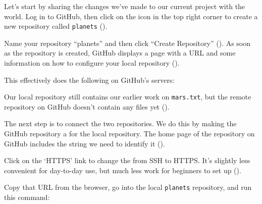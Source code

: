 Let's start by sharing the changes we've made to our current project
with the world. Log in to GitHub, then click on the icon in the top
right corner to create a new repository called \texttt{planets}
().



Name your repository ``planets'' and then click ``Create Repository'' ().
As soon as the repository is created, GitHub displays a page with a URL
and some information on how to configure your local repository ().


This effectively does the following on GitHub's servers:


Our local repository still contains our earlier work on
\texttt{mars.txt}, but the remote repository on GitHub doesn't contain
any files yet ().


The next step is to connect the two repositories. We do this by making
the GitHub repository a  for the
local repository. The home page of the repository on GitHub includes the
string we need to identify it ().


Click on the `HTTPS' link to change the 
from SSH to HTTPS. It's slightly less convenient for day-to-day use, but
much less work for beginners to set up ().


Copy that URL from the browser, go into the local \texttt{planets}
repository, and run this command:

